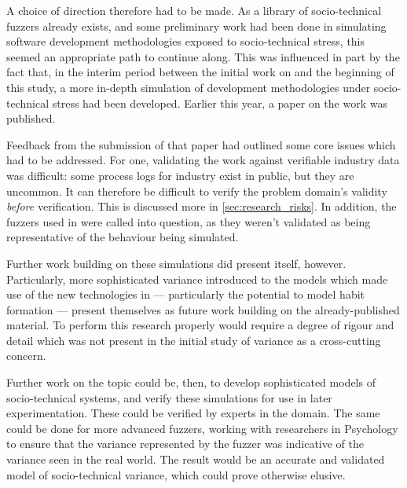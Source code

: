 \documentclass[draft]{article}
\begin{document}
A choice of direction therefore had to be made. As a library of socio-technical
fuzzers already exists\cite{fuzzi_moss_repo}, and some preliminary work had been
done in simulating software development methodologies exposed to socio-technical
stress, this seemed an appropriate path to continue along. This was influenced
in part by the fact that, in the interim period between the initial work on
\pdsf{}\cite{honours_thesis} and the beginning of this study, a more in-depth
simulation of development methodologies under socio-technical stress had been
developed. Earlier this year, a paper on the work was
published\cite{caise_forum_18}.\par

Feedback from the submission of that paper had outlined some core issues which
had to be addressed. For one, validating the work against verifiable industry
data was difficult: some process logs for industry exist in public, but they are
uncommon. It can therefore be difficult to verify the problem domain's validity
\emph{before} verification. This is discussed more in \cref{sec:research_risks}. In
addition, the fuzzers used in \cite{caise_forum_18} were called into question,
as they weren't validated as being representative of the behaviour being
simulated.\par

Further work building on these simulations did present itself, however.
Particularly, more sophisticated variance introduced to the models which made
use of the new technologies in \pdsf{} --- particularly the potential to model
habit formation --- present themselves as future work building on the
already-published material. To perform this research properly would require a
degree of rigour and detail which was not present in the initial study of
variance as a cross-cutting concern.\par

Further work on the topic could be, then, to develop sophisticated models of
socio-technical systems, and verify these simulations for use in later
experimentation. These could be verified by experts in the domain. The same
could be done for more advanced fuzzers, working with researchers in Psychology
to ensure that the variance represented by the fuzzer was indicative of the
variance seen in the real world. The result would be an accurate and validated
model of socio-technical variance, which could prove otherwise elusive.\par
\end{document}
